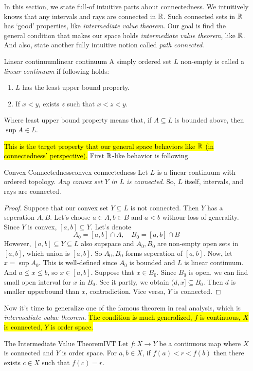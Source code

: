 \documentclass[12pt, a4paper, twoside]{article}
\theoremstyle{plain}
\begin{document}
In this section, we state full-of intuitive parts about connectedness. 
We intuitively knows that any intervals and rays are connected in ${\mathbb {R}}$. 
Such connected sets in ${\mathbb {R}}$ has \lq good' properties, like \textit{intermediate value theorem}. 
Our goal is find the general condition that makes our space holds \textit{intermediate value theorem}, like ${\mathbb {R}}$. 
And also, state another fully intuitive notion called \textit{path connected}. 

\begin{defn}{Linear continuum}{linear continuum}
    A simply ordered set $L$ non-empty is called a \textit{linear continuum} if following holds: 
    \begin{enumerate}
        \item $L$ has the least upper bound property.
        \item If $x < y$, exists $z$ such that $x < z < y$. 
    \end{enumerate}
    Where least upper bound property means that, 
    if $A \subseteq L$ is bounded above, then $\sup A \in L$. 
\end{defn}

\hl{This is the target property that our general space behaviors like ${\mathbb {R}}$ (in connectedness' perspective).}
First ${\mathbb {R}}$-like behavior is following. 

\begin{thm}{Convex Connectedness}{convex connectedness}
    Let $L$ is a linear continuum with ordered topology. \textit{Any convex set $Y$ in $L$ is connected}. 
    So, $L$ itself, intervals, and rays are connected. 
\end{thm}

\begin{proof}
    Suppose that our convex set $Y \subseteq L$ is not connected. 
    Then $Y$ has a seperation $A, B$. 
    Let's choose $a \in A, b \in B$ and $a < b$ withour loss of generality. 
    Since $Y$ is convex, $[a,b] \subseteq Y$. 
    Let's denote 
    \[A_0 = [a,b] \cap A, \quad B_0 = [a,b] \cap B\]
    However, $[a,b] \subseteq Y \subseteq L$ also supspace and $A_0, B_0$ are non-empty open sets in $[a, b]$, which union is $[a,b]$. 
    So $A_0, B_0$ forms seperation of $[a, b]$.
    Now, let $x = \sup A_0$. This is well-defined since $A_0$ is bounded and $L$ is linear continuum. 
    And $a \leq x \leq b$, so $x \in [a,b]$. Suppose that $x \in B_0$. 
    Since $B_0$ is open, we can find small open interval for $x$ in $B_0$. 
    See it partly, we obtain $(d, x] \subseteq B_0$. Then $d$ is smaller upperbound than $x$, contradiction. 
    Vice versa, $Y$ is connected. 
\end{proof}
Now it's time to generalize one of the famous theorem in real analysis, which is \textit{intermediate value theorem}. 
\hl{The condition is much generalized, $f$ is continuous, $X$ is connected, $Y$ is order space. }
\begin{thm}{The Intermediate Value Theorem}{IVT}
    Let $f: X \rightarrow Y$ be a continuous map where $X$ is connected and $Y$ is order space. 
    For $a, b \in X$, if $f(a) < r < f(b)$ then there exists $c \in X$ such that $f(c) = r$. 
\end{thm}
\end{document}
